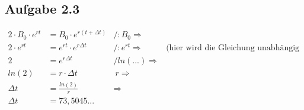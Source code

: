 \subsection*{Aufgabe 2.3}

\begin{align*}
2 \cdot B_0 \cdot e^{r t} &= B_0 \cdot e^{r(t+\Delta t)}&/ :B_0 \Rightarrow&\\
2 \cdot e^{r t} &= e^{r t} \cdot e^{r \Delta t} & / :e^{r t} \Rightarrow  & \text{(hier wird die Gleichung unabhängig gemacht)}\\
2 &= e^{r \Delta t}&/ ln(...)  \Rightarrow  &\\
ln(2) &= r \cdot \Delta t&\:r  \Rightarrow  &\\
\Delta t &= \frac{ln(2)}{r}& \Rightarrow  &\\
\Delta t &= 73,5045...&&
\end{align*}

\newpage
